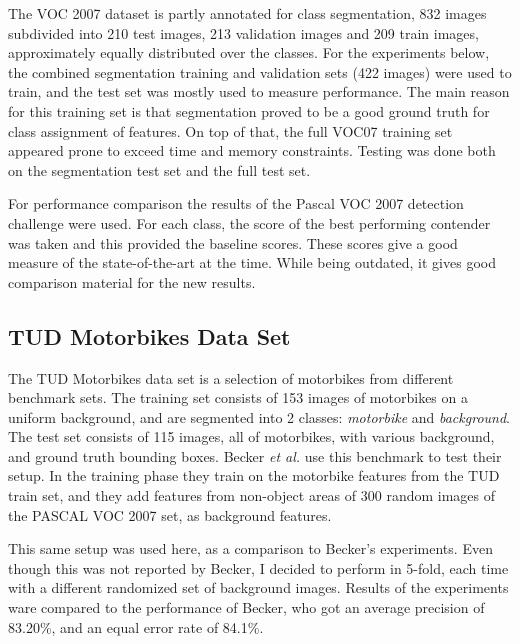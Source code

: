 The VOC 2007 dataset is partly annotated for class segmentation, 832 images subdivided into 210 test images, 213 validation images and 209 train images, approximately equally distributed over the classes. For the experiments below, the combined segmentation training and validation sets (422 images) were used to train, and the test set was mostly used to measure performance. The main reason for this training set is that segmentation proved to be a good ground truth for class assignment of features. On top of that, the full VOC07 training set appeared prone to exceed time and memory constraints. Testing was done both on the segmentation test set and the full test set.

For performance comparison the results of the Pascal VOC 2007 detection challenge were used. For each class, the score of the best performing contender was taken and this provided the baseline scores. These scores give a good measure of the state-of-the-art at the time. While being outdated, it gives good comparison material for the new results.


\subsection{TUD Motorbikes Data Set} %
\label{sec:tudmotorbikes_data_set}
The TUD Motorbikes data set is a selection of motorbikes from different benchmark sets. \cite{fritz2005integrating} The training set consists of 153 images of motorbikes on a uniform background, and are segmented into 2 classes: \emph{motorbike} and \emph{background}. The test set consists of 115 images, all of motorbikes, with various background, and ground truth bounding boxes. Becker \emph{et al.} \cite{becker2012codebook} use this benchmark to test their setup. In the training phase they train on the motorbike features from the TUD train set, and they add features from non-object areas of 300 random images of the PASCAL VOC 2007 set, as background features.

This same setup was used here, as a comparison to Becker's experiments. Even though this was not reported by Becker, I decided to perform in 5-fold, each time with a different randomized set of background images. Results of the experiments ware compared to the performance of Becker, who got an average precision of 83.20\%, and an equal error rate of 84.1\%.



